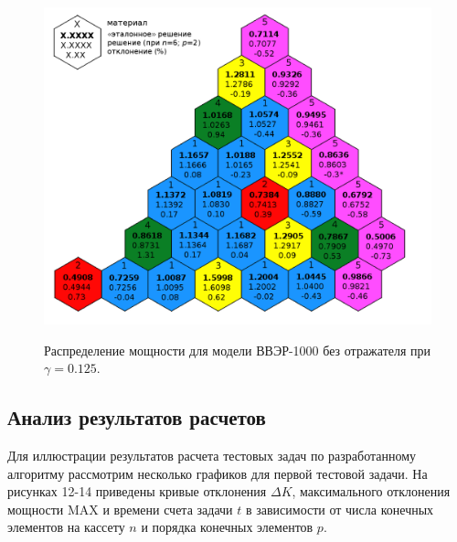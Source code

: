 \begin{figure}[H]
	\includegraphics[width=0.70\linewidth]{power_vver_0125_6_2.png}\\
	\caption{\label{image:canonsummary}Распределение мощности для модели ВВЭР-1000 без отражателя при $\gamma=0.125$.}
	\label{ris:power6}
\end{figure}

\subsection{Анализ результатов расчетов}
\label{s-4-4}
Для иллюстрации результатов расчета тестовых задач по разработанному алгоритму рассмотрим несколько графиков для первой тестовой задачи. На рисунках 12-14 приведены кривые отклонения $\Delta K$, максимального отклонения мощности MAX и времени счета задачи $t$ в зависимости от числа конечных элементов на кассету $n$ и порядка конечных элементов $p$. 

